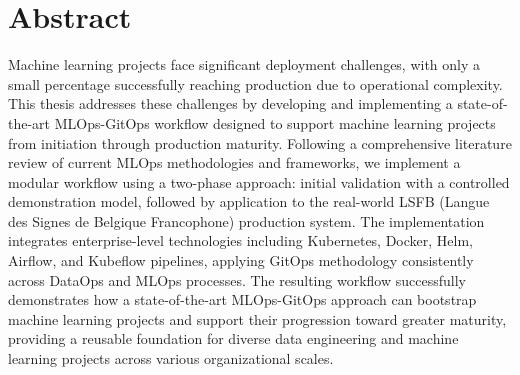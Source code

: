\thispagestyle{empty}
\section*{Abstract}
Machine learning projects face significant deployment challenges, with only a small percentage successfully reaching production due to operational complexity.
This thesis addresses these challenges by developing and implementing a state-of-the-art MLOps-GitOps workflow designed to support machine learning projects from initiation through production maturity.
Following a comprehensive literature review of current MLOps methodologies and frameworks, we implement a modular workflow using a two-phase approach: initial validation with a controlled demonstration model, followed by application to the real-world LSFB (Langue des Signes de Belgique Francophone) production system.
The implementation integrates enterprise-level technologies including Kubernetes, Docker, Helm, Airflow, and Kubeflow pipelines, applying GitOps methodology consistently across DataOps and MLOps processes.
The resulting workflow successfully demonstrates how a state-of-the-art MLOps-GitOps approach can bootstrap machine learning projects and support their progression toward greater maturity, providing a reusable foundation for diverse data engineering and machine learning projects across various organizational scales.


